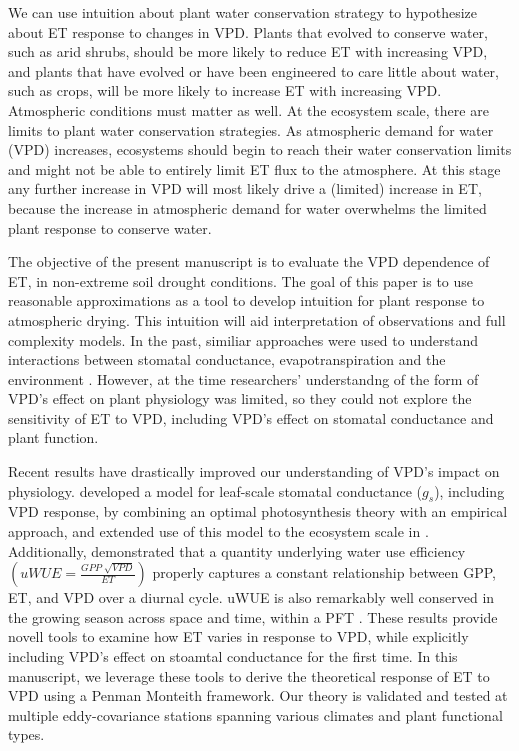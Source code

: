 \documentclass[draft,linenumbers]{agujournal}
\begin{document}
We can use intuition about plant water conservation strategy to hypothesize about ET response to changes in VPD. Plants that evolved to conserve water, such as arid shrubs, should be more likely to reduce ET with increasing VPD, and plants that have evolved or have been engineered to care little about water, such as crops, will be more likely to increase ET with increasing VPD. Atmospheric conditions must matter as well. At the ecosystem scale, there are limits to plant water conservation strategies. As atmospheric demand for water (VPD) increases, ecosystems should begin to reach their water conservation limits and might not be able to entirely limit ET flux to the atmosphere. At this stage any further increase in VPD will most likely drive a (limited) increase in ET, because the increase in atmospheric demand for water overwhelms the limited plant response to conserve water.

The objective of the present manuscript is to evaluate the VPD dependence of ET, in non-extreme soil drought conditions. The goal of this paper is to use reasonable approximations as a tool to develop intuition for plant response to atmospheric drying. This intuition will aid interpretation of observations and full complexity models. In the past, similiar approaches were used to understand interactions between stomatal conductance, evapotranspiration and the environment \citep[e.g.,][]{Jarvis_1986, Mcnaughton_1991}. However, at the time researchers' understandng of the form of VPD's effect on plant physiology was limited, so they could not explore the sensitivity of ET to VPD, including VPD's effect on stomatal conductance and plant function.

Recent results have drastically improved our understanding of VPD's impact on physiology. \citet{MEDLYN_2011} developed a model for leaf-scale stomatal conductance ($g_s$), including VPD response, by combining an optimal photosynthesis theory \citep{Farquhar_1980, Katul_2010} with an empirical approach, and extended use of this model to the ecosystem scale in \citet{Medlyn_2017}. Additionally, \citet{Zhou_2014} demonstrated that a quantity underlying water use efficiency $\left(uWUE = \frac{GPP\; \sqrt{VPD}}{ET}\right)$ properly captures a constant relationship between GPP, ET, and VPD over a diurnal cycle. uWUE is also remarkably well conserved in the growing season across space and time, within a PFT \citep{Zhou_2015}. These results provide novell tools to examine how ET varies in response to VPD, while explicitly including VPD's effect on stoamtal conductance for the first time. In this manuscript, we leverage these tools to derive the theoretical response of ET to VPD using a Penman Monteith framework. Our theory is validated and tested at multiple eddy-covariance stations spanning various climates and plant functional types. 
\end{document}
